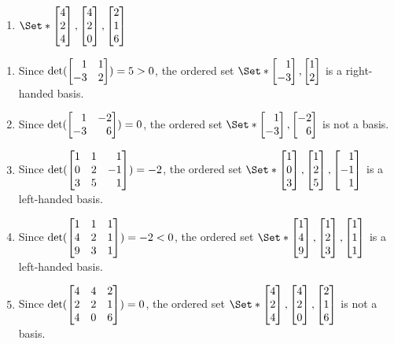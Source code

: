 \begin{exercises}
\begin{problist}
\begin{enumerate}
			\item $\Set*{\mat{4 \\ 2 \\ 4},\mat{4 \\ 2 \\ 0},\mat{2 \\ 1 \\ 6}}$
		\end{enumerate}
        \begin{solution}
        \begin{enumerate}
          \item Since $\det(\mat{1 & 1 \\ -3 & 2})=5>0$, the ordered set $\Set*{\mat{1 \\ -3},\mat{1 \\ 2}}$ is a right-handed basis.
          \item Since $\det(\mat{1 & -2 \\ -3 & 6})=0$, the ordered set $\Set*{\mat{1 \\ -3},\mat{-2 \\ 6}}$ is not a basis.
          \item Since $\det(\mat{1 & 1 & 1 \\ 0 & 2 & -1 \\ 3 & 5 & 1})=-2$, the ordered set $\Set*{\mat{1 \\ 0 \\ 3},\mat{1 \\ 2 \\ 5},\mat{1 \\ -1 \\ 1}}$ is a left-handed basis.
          \item Since $\det(\mat{1 & 1 & 1 \\ 4 & 2 & 1 \\ 9 & 3 & 1})=-2<0$, the ordered set $\Set*{\mat{1 \\ 4 \\ 9},\mat{1 \\ 2 \\ 3},\mat{1 \\ 1 \\ 1}}$ is a left-handed basis.
          \item Since $\det(\mat{4 & 4 & 2 \\ 2 & 2 & 1 \\ 4 & 0 & 6})=0$, the ordered set $\Set*{\mat{4 \\ 2 \\ 4},\mat{4 \\ 2 \\ 0},\mat{2 \\ 1 \\ 6}}$ is not a basis.
        \end{enumerate}
        \end{solution}


\end{problist}
\end{exercises}
